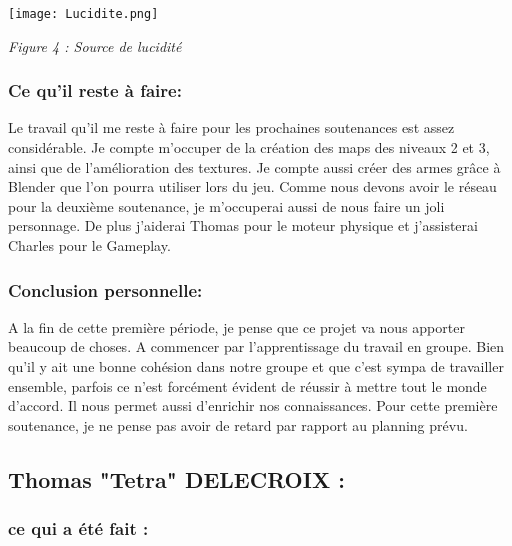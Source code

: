 \documentclass[a4paper]{article}
\begin{document}
\quad

\begin{center}

\texttt{[image: Lucidite.png]}

\quad

\textit {Figure 4 : Source de lucidité}

\end{center}

\quad

		\subsubsection{Ce qu'il reste à faire:}
\quad

Le travail qu'il me reste à faire pour les prochaines soutenances est assez considérable. Je compte m'occuper de la création des maps des niveaux 2 et 3, ainsi que de l'amélioration des textures. Je compte aussi créer des armes grâce à Blender que l'on pourra utiliser lors du jeu. Comme nous devons avoir le réseau pour la deuxième soutenance, je m'occuperai aussi de nous faire un joli personnage. De plus j'aiderai Thomas pour le moteur physique et j'assisterai Charles pour le Gameplay. 

\quad
\newpage

		\subsubsection{Conclusion personnelle:}

\quad

A la fin de cette première période, je pense que ce projet va nous apporter beaucoup de choses. A commencer par l’apprentissage du travail en groupe. Bien qu’il y ait une bonne cohésion dans notre groupe et que c’est sympa de travailler ensemble, parfois ce n’est forcément évident de réussir à mettre tout le monde d’accord. Il nous permet aussi d’enrichir nos connaissances.
Pour cette première soutenance, je ne pense pas avoir de retard par rapport au planning prévu.

\quad

\newpage

	\subsection{Thomas "Tetra" DELECROIX :}

\quad


		\subsubsection{ce qui a été fait :}
\end{document}
